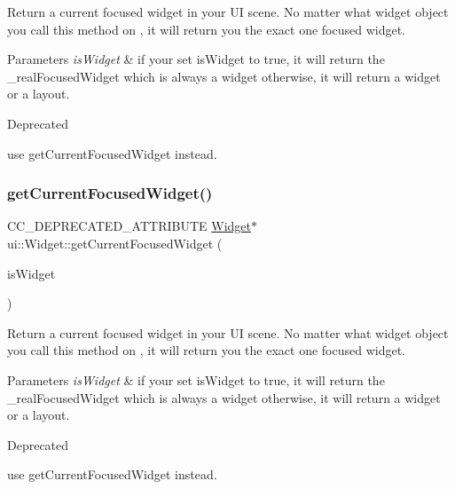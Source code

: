 Return a current focused widget in your UI scene. No matter what widget object you call this method on , it will return you the exact one focused widget. 
\begin{DoxyParams}{Parameters}
{\em is\+Widget} & if your set is\+Widget to true, it will return the \+\_\+real\+Focused\+Widget which is always a widget otherwise, it will return a widget or a layout. \\
\hline
\end{DoxyParams}
\begin{DoxyRefDesc}{Deprecated}
\item[\hyperlink{deprecated__deprecated000180}{Deprecated}]use {\ttfamily get\+Current\+Focused\+Widget} instead. \end{DoxyRefDesc}
\mbox{\label{classui_1_1Widget_aa99022fd0622fc02512aabc82ff4bce6}} 
\subsubsection{\texorpdfstring{get\+Current\+Focused\+Widget()}{getCurrentFocusedWidget()}\hspace{0.1cm}{\footnotesize\ttfamily [2/4]}}
{\footnotesize\ttfamily C\+C\+\_\+\+D\+E\+P\+R\+E\+C\+A\+T\+E\+D\+\_\+\+A\+T\+T\+R\+I\+B\+U\+TE \hyperlink{classui_1_1Widget}{Widget}$\ast$ ui\+::\+Widget\+::get\+Current\+Focused\+Widget (\begin{DoxyParamCaption}\item[{bool}]{is\+Widget }\end{DoxyParamCaption})}

Return a current focused widget in your UI scene. No matter what widget object you call this method on , it will return you the exact one focused widget. 
\begin{DoxyParams}{Parameters}
{\em is\+Widget} & if your set is\+Widget to true, it will return the \+\_\+real\+Focused\+Widget which is always a widget otherwise, it will return a widget or a layout. \\
\hline
\end{DoxyParams}
\begin{DoxyRefDesc}{Deprecated}
\item[\hyperlink{deprecated__deprecated000415}{Deprecated}]use {\ttfamily get\+Current\+Focused\+Widget} instead. \end{DoxyRefDesc}
\mbox{\label{classui_1_1Widget_a19ad19e126921fa54eec6e5ac8757719}} 
